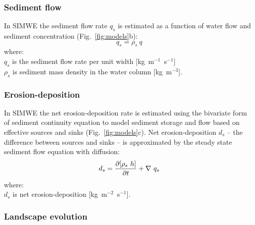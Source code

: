 \documentclass[gmd, manuscript]{copernicus}
\begin{document}
\subsubsection{Sediment flow}

In SIMWE the sediment flow rate $q_s$ is estimated
as a function of water flow and sediment concentration
\citep{Mitas1998}
(Fig.~\ref{fig:models}b): 
\begin{equation}\label{eq:sedflow} 
q_s = \rho_s ~ q
\end{equation}
{\small
\noindent
where: \\
\hspace*{0.5em} $q_s$ is the sediment flow rate per unit width [\unit{kg~m}$^{-1}$~\unit{s}$^{-1}$]\\
\hspace*{0.5em} $\rho_s$ is sediment mass density in the water column [\unit{kg~m}$^{-3}$].\\
}


\subsubsection{Erosion-deposition}

In SIMWE 
the net erosion-deposition rate is estimated
using the bivariate form of sediment continuity equation
to model sediment storage and flow 
based on effective sources and sinks
(Fig.~\ref{fig:models}c). 
Net erosion-deposition $d_s$
-- the difference between sources and sinks --
is approximated by
the steady state sediment flow equation with diffusion:
\begin{equation}\label{eq:sediment} 
d_s = 
{\partial [\rho_s ~ h] \over \partial t} +
\nabla~q_s
\end{equation}
{\small
\noindent
where: \\
\hspace*{0.5em} $d_s$ is net erosion-deposition [\unit{kg~m}$^{-2}$~\unit{s}$^{-1}$].\\
}


\subsubsection{Landscape evolution}
\end{document}
